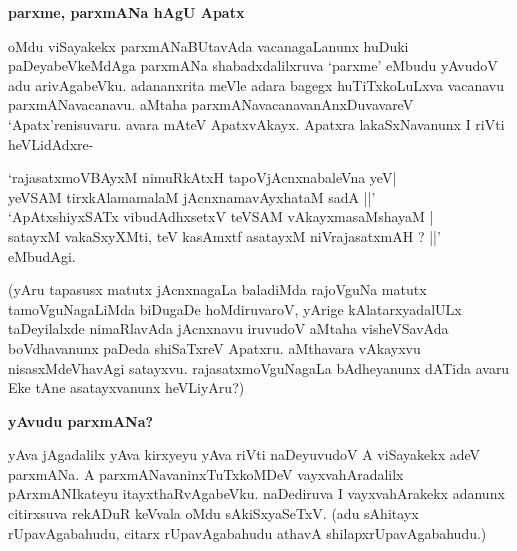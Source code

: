 {\bf parxme, parxmANa hAgU Apatx}

oMdu viSayakekx parxmANaBUtavAda vacanagaLanunx huDuki paDeyabeVkeMdAga parxmANa shabadxdalilxruva `parxme' eMbudu yAvudoV adu arivAgabeVku. adananxrita meVle adara bagegx huTiTxkoLuLxva vacanavu parxmANavacanavu. aMtaha parxmANavacanavanAnxDuvavareV `Apatx'renisuvaru. avara mAteV ApatxvAkayx. Apatxra lakaSxNavanunx I riVti heVLidAdxre-

\begin{shloka}
`rajasatxmoVBAyxM nimuRkAtxH tapoVjAcnxnabaleVna yeV|\\
yeVSAM tirxkAlamamalaM jAcnxnamavAyxhataM sadA ||'\\
`ApAtxshiyxSATx vibudAdhxsetxV teVSAM vAkayxmasaMshayaM |\\
satayxM vakaSxyXMti, teV kasAmxtf asatayxM niVrajasatxmAH ? ||' eMbudAgi.
\end{shloka}

(yAru tapasusx matutx jAcnxnagaLa baladiMda rajoVguNa matutx tamoVguNagaLiMda biDugaDe hoMdiruvaroV, yArige kAlatarxyadalULx taDeyilalxde nimaRlavAda jAcnxnavu iruvudoV aMtaha visheVSavAda boVdhavanunx paDeda shiSaTxreV Apatxru. aMthavara vAkayxvu nisasxMdeVhavAgi satayxvu. rajasatxmoVguNagaLa bAdheyanunx dATida avaru Eke tAne asatayxvanunx heVLiyAru?)

{\bf yAvudu parxmANa?}

yAva jAgadalilx yAva kirxyeyu yAva riVti naDeyuvudoV A viSayakekx adeV parxmANa. A parxmANavaninxTuTxkoMDeV vayxvahAradalilx pArxmANIkateyu itayxthaRvAgabeVku. naDediruva I vayxvahArakekx adanunx citirxsuva rekADuR keVvala oMdu sAkiSxyaSeTxV. (adu sAhitayx rUpavAgabahudu, citarx rUpavAgabahudu athavA shilapxrUpavAgabahudu.)

